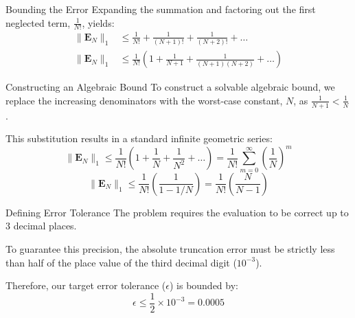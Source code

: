 \documentclass{beamer}
\providecommand{\norm}[1]{\lVert#1\rVert}
\numberwithin{equation}{section}
\begin{document}
\begin{frame}{Bounding the Error}
Expanding the summation and factoring out the first neglected term, $\frac{1}{N!}$, yields:
\begin{align}
    \norm{\mathbf{E}_N}_1 &\le \frac{1}{N!} + \frac{1}{(N+1)!} + \frac{1}{(N+2)!} + \dots \\
    \norm{\mathbf{E}_N}_1 &\le \frac{1}{N!} \left( 1 + \frac{1}{N+1} + \frac{1}{(N+1)(N+2)} + \dots \right)
\end{align}
\end{frame}

\begin{frame}{Constructing an Algebraic Bound}
To construct a solvable algebraic bound, we replace the increasing denominators with the worst-case constant, $N$, as $\frac{1}{N+1} < \frac{1}{N}$.
\vspace{0.3cm}

This substitution results in a standard infinite geometric series:
\begin{equation}
    \norm{\mathbf{E}_N}_1 \le \frac{1}{N!} \left( 1 + \frac{1}{N} + \frac{1}{N^2} + \dots \right) = \frac{1}{N!} \sum_{m=0}^{\infty} \left(\frac{1}{N}\right)^m
\end{equation}
\begin{equation}
    \norm{\mathbf{E}_N}_1 \le \frac{1}{N!} \left( \frac{1}{1 - 1/N} \right) = \frac{1}{N!} \left( \frac{N}{N-1} \right)
\end{equation}
\end{frame}
\begin{frame}{Defining Error Tolerance}
The problem requires the evaluation to be correct up to 3 decimal places.
\vspace{0.3cm}

To guarantee this precision, the absolute truncation error must be strictly less than half of the place value of the third decimal digit ($10^{-3}$).
\vspace{0.5cm}

Therefore, our target error tolerance ($\epsilon$) is bounded by:
\begin{equation}
    \epsilon \le \frac{1}{2} \times 10^{-3} = 0.0005
\end{equation}
\vspace{0.5cm}

\end{frame}
\end{document}
